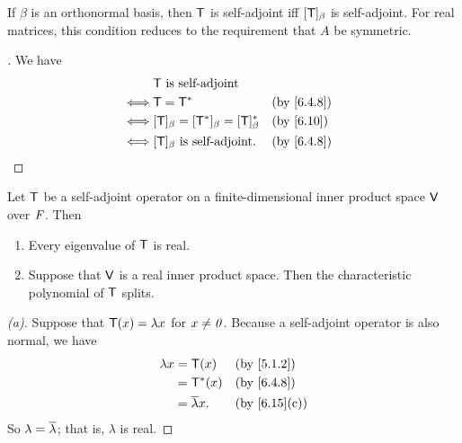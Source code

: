 \begin{cor}\label{6.4.9}
  If \(\beta\) is an orthonormal basis, then \(\mathsf{T}\) is self-adjoint iff \([\mathsf{T}]_{\beta}\) is self-adjoint.
  For real matrices, this condition reduces to the requirement that \(A\) be symmetric.
\end{cor}

\begin{proof}[]
  We have
  \begin{align*}
         & \T \text{ is self-adjoint}                                                   \\
    \iff & \T = \T^*                                      &  & \text{(by \cref{6.4.8})} \\
    \iff & [\T]_{\beta} = [\T^*]_{\beta} = [\T]_{\beta}^* &  & \text{(by \cref{6.10})}  \\
    \iff & [\T]_{\beta} \text{ is self-adjoint}.          &  & \text{(by \cref{6.4.8})}
  \end{align*}
\end{proof}

\begin{lem}\label{6.4.10}
  Let \(\mathsf{T}\) be a self-adjoint operator on a finite-dimensional inner product space \(\mathsf{V}\) over \(\mathit{F}\).
  Then
  \begin{enumerate}
    \item Every eigenvalue of \(\mathsf{T}\) is real.
    \item Suppose that \(\mathsf{V}\) is a real inner product space.
          Then the characteristic polynomial of \(\mathsf{T}\) splits.
  \end{enumerate}
\end{lem}

\begin{proof}[(a)]
  Suppose that \(\mathsf{T}(x) = \lambda x\) for \(x \neq \mathit{0}\).
  Because a self-adjoint operator is also normal, we have
  \begin{align*}
    \lambda x & = \T(x)             &  & \text{(by \cref{5.1.2})}   \\
              & = \T^*(x)           &  & \text{(by \cref{6.4.8})}   \\
              & = \conj{\lambda} x. &  & \text{(by \cref{6.15}(c))}
  \end{align*}
  So \(\lambda = \overline{\lambda}\);
  that is, \(\lambda\) is real.
\end{proof}

